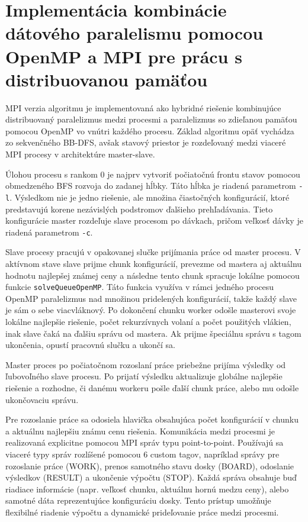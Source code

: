 \documentclass[a4paper]{article}
\begin{document}
\section{Implementácia kombinácie dátového paralelismu pomocou OpenMP a MPI pre prácu s distribuovanou pamäťou}

MPI verzia algoritmu je implementovaná ako hybridné riešenie kombinujúce distribuovaný paralelizmus medzi procesmi a paralelizmus so zdieľanou pamäťou pomocou OpenMP vo vnútri každého procesu. 
Základ algoritmu opäť vychádza zo sekvenčného BB-DFS, avšak stavový priestor je rozdeľovaný medzi viaceré MPI procesy v architektúre master-slave.

Úlohou procesu s rankom $0$ je najprv vytvoriť počiatočnú frontu stavov pomocou obmedzeného BFS rozvoja do zadanej hĺbky. Táto hĺbka je riadená parametrom \texttt{-l}. 
Výsledkom nie je jedno riešenie, ale množina čiastočných konfigurácií, ktoré predstavujú korene nezávislých podstromov ďalšieho prehľadávania. 
Tieto konfigurácie master rozdeľuje slave procesom po dávkach, pričom veľkosť dávky je riadená parametrom \texttt{-c}.

Slave procesy pracujú v opakovanej slučke prijímania práce od master procesu. 
V aktívnom stave slave prijme chunk konfigurácií, prevezme od mastera aj aktuálnu hodnotu najlepšej známej ceny a následne tento chunk spracuje lokálne pomocou funkcie \texttt{solveQueueOpenMP}. 
Táto funkcia využíva v rámci jedného procesu OpenMP paralelizmus nad množinou pridelených konfigurácií, takže každý slave je sám o sebe viacvláknový. 
Po dokončení chunku worker odošle masterovi svoje lokálne najlepšie riešenie, počet rekurzívnych volaní a počet použitých vlákien, inak slave čaká na ďalšiu správu od mastera. 
Ak prijme špeciálnu správu s tagom ukončenia, opustí pracovnú slučku a ukončí sa.

Master proces po počiatočnom rozoslaní práce priebežne prijíma výsledky od ľubovoľného slave procesu. 
Po prijatí výsledku aktualizuje globálne najlepšie riešenie a rozhodne, či danému workeru pošle ďalší chunk práce, alebo mu odošle ukončovaciu správu. 

Pre rozoslanie práce sa odosiela hlavička obsahujúca počet konfigurácií v chunku a aktuálnu najlepšiu známu cenu riešenia. 
Komunikácia medzi procesmi je realizovaná explicitne pomocou MPI správ typu point-to-point. Používajú sa viaceré typy správ rozlíšené pomocou 6 custom tagov, napríklad správy pre rozoslanie práce (WORK), prenos samotného stavu dosky (BOARD), odoslanie výsledkov (RESULT) a ukončenie výpočtu (STOP). Každá správa obsahuje buď riadiace informácie (napr. veľkosť chunku, aktuálnu hornú medzu ceny), alebo samotné dáta reprezentujúce konfiguráciu dosky. Tento prístup umožňuje flexibilné riadenie výpočtu a dynamické prideľovanie práce medzi procesmi.
\end{document}
